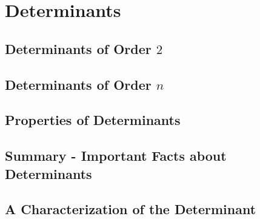 \setcounter{chapter}{3}
\chapter{Determinants}

\section{Determinants of Order $2$}



\vspace{12pt}

\setcounter{Exercise}{10}



\section{Determinants of Order $n$}




\section{Properties of Determinants}



\vspace{12pt}

\setcounter{Exercise}{14}


\vspace{12pt}

\setcounter{Exercise}{20}



\section{Summary - Important Facts about Determinants}


\section{A Characterization of the Determinant}
